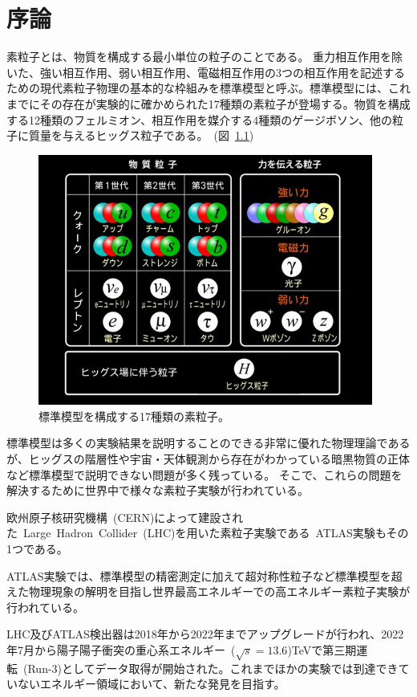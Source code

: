 \chapter{序論}
素粒子とは、物質を構成する最小単位の粒子のことである。
重力相互作用を除いた、強い相互作用、弱い相互作用、電磁相互作用の3つの相互作用を記述するための現代素粒子物理の基本的な枠組みを標準模型と呼ぶ。標準模型には、これまでにその存在が実験的に確かめられた17種類の素粒子が登場する。物質を構成する12種類のフェルミオン、相互作用を媒介する4種類のゲージボソン、他の粒子に質量を与えるヒッグス粒子である。~(図~\ref{fig:1-1})

\begin{figure}[h]
  \centering
  \includegraphics[clip, width=11cm]{fig/1/standardmodel_v2.jpg}
  \caption{標準模型を構成する17種類の素粒子。\cite{article:ATLAS_japan}}
  \label{fig:1-1}
\end{figure}

\newpage

標準模型は多くの実験結果を説明することのできる非常に優れた物理理論であるが、ヒッグスの階層性や宇宙・天体観測から存在がわかっている暗黒物質の正体など標準模型で説明できない問題が多く残っている。
そこで、これらの問題を解決するために世界中で様々な素粒子実験が行われている。

欧州原子核研究機構~(CERN)\cite{article:CERN}によって建設された~Large~Hadron~Collider~(LHC)\cite{article:LHC}を用いた素粒子実験である~ATLAS実験\cite{article:ATLAS}もその1つである。

ATLAS実験では、標準模型の精密測定に加えて超対称性粒子など標準模型を超えた物理現象の解明を目指し世界最高エネルギーでの高エネルギー素粒子実験が行われている。

LHC及びATLAS検出器は2018年から2022年までアップグレードが行われ、2022年7月から陽子陽子衝突の重心系エネルギー~($\sqrt{s}=13.6$)TeVで第三期運転~(Run-3)としてデータ取得が開始された。これまでほかの実験では到達できていないエネルギー領域において、新たな発見を目指す。